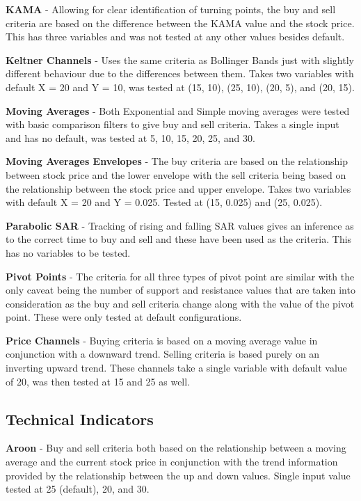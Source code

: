 \documentclass[conference]{IEEEtran}
\begin{document}
\textbf{KAMA} - Allowing for clear identification of turning points, the buy and sell criteria are based on the difference between the KAMA value and the stock price. This has three variables and was not tested at any other values besides default.

\textbf{Keltner Channels} - Uses the same criteria as Bollinger Bands just with slightly different behaviour due to the differences between them. Takes two variables with default X = 20 and Y = 10, was tested at (15, 10), (25, 10), (20, 5), and (20, 15).

\textbf{Moving Averages} - Both Exponential and Simple moving averages were tested with basic comparison filters to give buy and sell criteria. Takes a single input and has no default, was tested at 5, 10, 15, 20, 25, and 30.

\textbf{Moving Averages Envelopes} - The buy criteria are based on the relationship between stock price and the lower envelope with the sell criteria being based on the relationship between the stock price and upper envelope. Takes two variables with default X = 20 and Y = 0.025. Tested at (15, 0.025) and (25, 0.025).

\textbf{Parabolic SAR} - Tracking of rising and falling SAR values gives an inference as to the correct time to buy and sell and these have been used as the criteria. This has no variables to be tested.

\textbf{Pivot Points} - The criteria for all three types of pivot point are similar with the only caveat being the number of support and resistance values that are taken into consideration as the buy and sell criteria change along with the value of the pivot point. These were only tested at default configurations.

\textbf{Price Channels} - Buying criteria is based on a moving average value in conjunction with a downward trend. Selling criteria is based purely on an inverting upward trend. These channels take a single variable with default value of 20, was then tested at 15 and 25 as well.

\subsection{Technical Indicators}

\textbf{Aroon} - Buy and sell criteria both based on the relationship between a moving average and the current stock price in conjunction with the trend information provided by the relationship between the up and down values. Single input value tested at 25 (default), 20, and 30.
\end{document}
